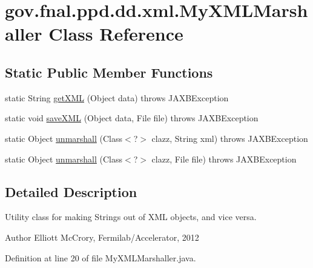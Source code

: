 \hypertarget{classgov_1_1fnal_1_1ppd_1_1dd_1_1xml_1_1MyXMLMarshaller}{\section{gov.\-fnal.\-ppd.\-dd.\-xml.\-My\-X\-M\-L\-Marshaller Class Reference}
\label{classgov_1_1fnal_1_1ppd_1_1dd_1_1xml_1_1MyXMLMarshaller}
}
\subsection*{Static Public Member Functions}
\begin{DoxyCompactItemize}
\item 
static String \hyperlink{classgov_1_1fnal_1_1ppd_1_1dd_1_1xml_1_1MyXMLMarshaller_a81528df65c4fd7426091e36416e1913f}{get\-X\-M\-L} (Object data)  throws J\-A\-X\-B\-Exception 
\item 
static void \hyperlink{classgov_1_1fnal_1_1ppd_1_1dd_1_1xml_1_1MyXMLMarshaller_aebf26fd9fce0e6866d13c36ed36408d0}{save\-X\-M\-L} (Object data, File file)  throws J\-A\-X\-B\-Exception 
\item 
static Object \hyperlink{classgov_1_1fnal_1_1ppd_1_1dd_1_1xml_1_1MyXMLMarshaller_a7b08a6b71a1603e3f4eb7dea6f0402b3}{unmarshall} (Class$<$?$>$ clazz, String xml)  throws J\-A\-X\-B\-Exception 
\item 
static Object \hyperlink{classgov_1_1fnal_1_1ppd_1_1dd_1_1xml_1_1MyXMLMarshaller_a5d210178cc498d18018e6bf535617724}{unmarshall} (Class$<$?$>$ clazz, File file)  throws J\-A\-X\-B\-Exception 
\end{DoxyCompactItemize}


\subsection{Detailed Description}
Utility class for making Strings out of X\-M\-L objects, and vice versa.

\begin{DoxyAuthor}{Author}
Elliott Mc\-Crory, Fermilab/\-Accelerator, 2012 
\end{DoxyAuthor}


Definition at line 20 of file My\-X\-M\-L\-Marshaller.\-java.



